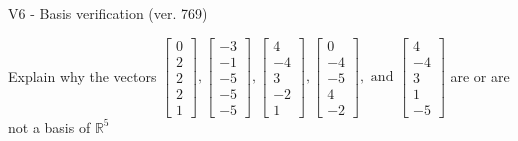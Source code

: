 \begin{exercise}
  \begin{exerciseTitle}V6 - Basis verification (ver. 769)\end{exerciseTitle}
  \begin{exerciseStatement}
    Explain why the vectors \(\left[\begin{array}{r}
0 \\
2 \\
2 \\
2 \\
1
\end{array}\right] , \left[\begin{array}{r}
-3 \\
-1 \\
-5 \\
-5 \\
-5
\end{array}\right] , \left[\begin{array}{r}
4 \\
-4 \\
3 \\
-2 \\
1
\end{array}\right] , \left[\begin{array}{r}
0 \\
-4 \\
-5 \\
4 \\
-2
\end{array}\right] , \text{ and } \left[\begin{array}{r}
4 \\
-4 \\
3 \\
1 \\
-5
\end{array}\right]\) are or are not a basis of \(\mathbb{R}^5\)	



\end{exerciseStatement}
\end{exercise}
